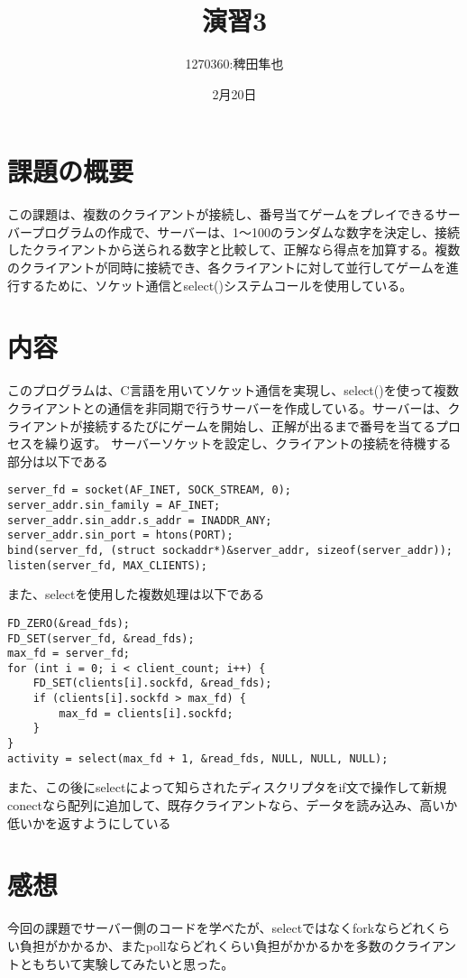 \documentclass{jlreq}
\title{演習3}
\author{1270360:稗田隼也}
\date{2月20日}
\begin{document}
\maketitle
\section{課題の概要}
この課題は、複数のクライアントが接続し、番号当てゲームをプレイできるサーバープログラムの作成で、サーバーは、1〜100のランダムな数字を決定し、接続したクライアントから送られる数字と比較して、正解なら得点を加算する。複数のクライアントが同時に接続でき、各クライアントに対して並行してゲームを進行するために、ソケット通信とselect()システムコールを使用している。
\section{内容}
このプログラムは、C言語を用いてソケット通信を実現し、select()を使って複数クライアントとの通信を非同期で行うサーバーを作成している。サーバーは、クライアントが接続するたびにゲームを開始し、正解が出るまで番号を当てるプロセスを繰り返す。
サーバーソケットを設定し、クライアントの接続を待機する部分は以下である
\begin{lstlisting}[caption=switch,label=fuga]
    server_fd = socket(AF_INET, SOCK_STREAM, 0);
server_addr.sin_family = AF_INET;
server_addr.sin_addr.s_addr = INADDR_ANY;
server_addr.sin_port = htons(PORT);
bind(server_fd, (struct sockaddr*)&server_addr, sizeof(server_addr));
listen(server_fd, MAX_CLIENTS);
\end{lstlisting}
また、selectを使用した複数処理は以下である
\begin{lstlisting}[caption=switch,label=fuga]
    FD_ZERO(&read_fds);
FD_SET(server_fd, &read_fds);
max_fd = server_fd;
for (int i = 0; i < client_count; i++) {
    FD_SET(clients[i].sockfd, &read_fds);
    if (clients[i].sockfd > max_fd) {
        max_fd = clients[i].sockfd;
    }
}
activity = select(max_fd + 1, &read_fds, NULL, NULL, NULL);

\end{lstlisting}
また、この後にselectによって知らされたディスクリプタをif文で操作して新規conectなら配列に追加して、既存クライアントなら、データを読み込み、高いか低いかを返すようにしている

\section{感想}
今回の課題でサーバー側のコードを学べたが、selectではなくforkならどれくらい負担がかかるか、またpollならどれくらい負担がかかるかを多数のクライアントともちいて実験してみたいと思った。
\end{document}
